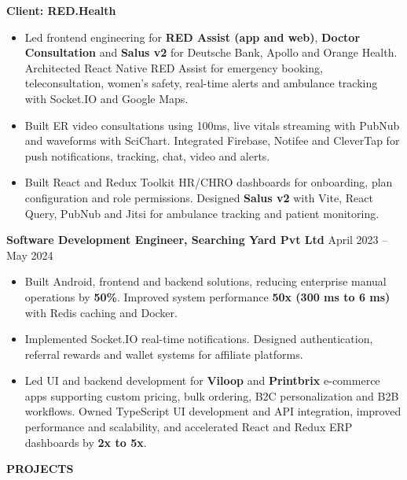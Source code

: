 \documentclass[letterpaper,10pt]{article}
\newcommand{\ressection}[1]{%
    \par\addvspace{4pt}%
    \Needspace{3\baselineskip}%
    {\fontsize{10.5pt}{11.2pt}\selectfont\bfseries #1\par}%
    \vspace{1.5pt}%
  }
\newcommand{\job}[2]{%
    \par\addvspace{2.5pt}%
    \Needspace{3\baselineskip}%
    \textbf{#1}\hfill
    {\fontsize{9.2pt}{10pt}\selectfont #2}\par
  }
\newcommand{\workgroup}[1]{%
    \par\addvspace{1.5pt}%
    \Needspace{2\baselineskip}%
    {\fontsize{9.4pt}{10.2pt}\selectfont\bfseries #1\par}%
  }
\begin{document}
  \workgroup{Client: RED.Health}

  \begin{itemize}
    \item Led frontend engineering for \textbf{RED Assist (app and web)},
    \textbf{Doctor Consultation} and \textbf{Salus v2} for Deutsche Bank,
    Apollo and Orange Health. Architected React Native RED Assist for
    emergency booking, teleconsultation, women's safety, real-time alerts
    and ambulance tracking with Socket.IO and Google Maps.

    \item Built ER video consultations using 100ms, live vitals streaming
    with PubNub and waveforms with SciChart. Integrated Firebase, Notifee
    and CleverTap for push notifications, tracking, chat, video and alerts.

    \item Built React and Redux Toolkit HR/CHRO dashboards for onboarding,
    plan configuration and role permissions. Designed \textbf{Salus v2}
    with Vite, React Query, PubNub and Jitsi for ambulance tracking and
    patient monitoring.
  \end{itemize}

  \job{Software Development Engineer, Searching Yard Pvt Ltd}
      {April 2023 -- May 2024}

  \begin{itemize}
    \item Built Android, frontend and backend solutions, reducing enterprise
    manual operations by \textbf{50\%}. Improved system performance
    \textbf{50x (300 ms to 6 ms)} with Redis caching and Docker.

    \item Implemented Socket.IO real-time notifications. Designed
    authentication, referral rewards and wallet systems for affiliate
    platforms.

    \item Led UI and backend development for \textbf{Viloop} and
    \textbf{Printbrix} e-commerce apps supporting custom pricing, bulk
    ordering, B2C personalization and B2B workflows. Owned TypeScript UI
    development and API integration, improved performance and scalability,
    and accelerated React and Redux ERP dashboards by \textbf{2x to 5x}.
  \end{itemize}


  \ressection{PROJECTS}
\end{document}
